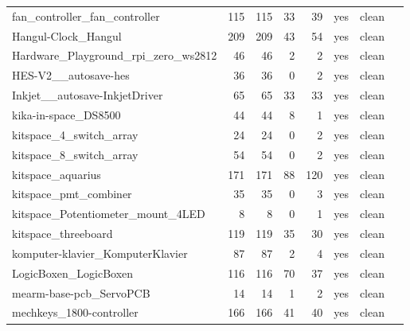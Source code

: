 \begin{longtable}{@{}p{0.36\linewidth}rrrrcp{0.22\linewidth}@{}}
fan\_\allowbreak{}controller\_\allowbreak{}fan\_\allowbreak{}controller & 115 & 115 & 33 & 39 & \textcolor{fraqua}{yes} & {\footnotesize clean} \\
Hangul-\allowbreak{}Clock\_\allowbreak{}Hangul & 209 & 209 & 43 & 54 & \textcolor{fraqua}{yes} & {\footnotesize clean} \\
Hardware\_\allowbreak{}Playground\_\allowbreak{}rpi\_\allowbreak{}zero\_\allowbreak{}ws2812 & 46 & 46 & 2 & 2 & \textcolor{fraqua}{yes} & {\footnotesize clean} \\
HES-\allowbreak{}V2\_\allowbreak{}\_\allowbreak{}autosave-\allowbreak{}hes & 36 & 36 & 0 & 2 & \textcolor{fraqua}{yes} & {\footnotesize clean} \\
Inkjet\_\allowbreak{}\_\allowbreak{}autosave-\allowbreak{}InkjetDriver & 65 & 65 & 33 & 33 & \textcolor{fraqua}{yes} & {\footnotesize clean} \\
kika-\allowbreak{}in-\allowbreak{}space\_\allowbreak{}DS8500 & 44 & 44 & 8 & 1 & \textcolor{fraqua}{yes} & {\footnotesize clean} \\
kitspace\_\allowbreak{}4\_\allowbreak{}switch\_\allowbreak{}array & 24 & 24 & 0 & 2 & \textcolor{fraqua}{yes} & {\footnotesize clean} \\
kitspace\_\allowbreak{}8\_\allowbreak{}switch\_\allowbreak{}array & 54 & 54 & 0 & 2 & \textcolor{fraqua}{yes} & {\footnotesize clean} \\
kitspace\_\allowbreak{}aquarius & 171 & 171 & 88 & 120 & \textcolor{fraqua}{yes} & {\footnotesize clean} \\
kitspace\_\allowbreak{}pmt\_\allowbreak{}combiner & 35 & 35 & 0 & 3 & \textcolor{fraqua}{yes} & {\footnotesize clean} \\
kitspace\_\allowbreak{}Potentiometer\_\allowbreak{}mount\_\allowbreak{}4LED & 8 & 8 & 0 & 1 & \textcolor{fraqua}{yes} & {\footnotesize clean} \\
kitspace\_\allowbreak{}threeboard & 119 & 119 & 35 & 30 & \textcolor{fraqua}{yes} & {\footnotesize clean} \\
komputer-\allowbreak{}klavier\_\allowbreak{}KomputerKlavier & 87 & 87 & 2 & 4 & \textcolor{fraqua}{yes} & {\footnotesize clean} \\
LogicBoxen\_\allowbreak{}LogicBoxen & 116 & 116 & 70 & 37 & \textcolor{fraqua}{yes} & {\footnotesize clean} \\
mearm-\allowbreak{}base-\allowbreak{}pcb\_\allowbreak{}ServoPCB & 14 & 14 & 1 & 2 & \textcolor{fraqua}{yes} & {\footnotesize clean} \\
mechkeys\_\allowbreak{}1800-\allowbreak{}controller & 166 & 166 & 41 & 40 & \textcolor{fraqua}{yes} & {\footnotesize clean} \\

\end{longtable}
